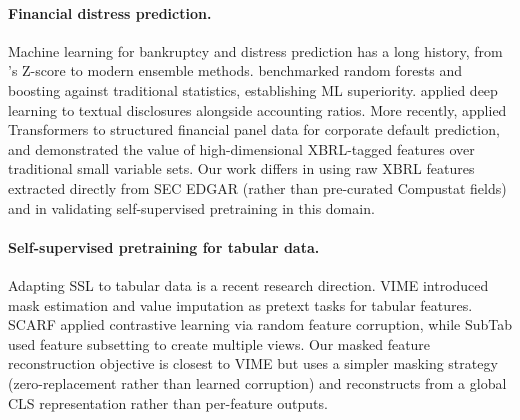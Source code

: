 \paragraph{Financial distress prediction.} Machine learning for bankruptcy and distress prediction has a long history, from \citet{altman1968financial}'s Z-score to modern ensemble methods. \citet{barboza2017machine} benchmarked random forests and boosting against traditional statistics, establishing ML superiority. \citet{mai2019deep} applied deep learning to textual disclosures alongside accounting ratios. More recently, \citet{korangi2023transformer} applied Transformers to structured financial panel data for corporate default prediction, and \citet{chen2022predicting} demonstrated the value of high-dimensional XBRL-tagged features over traditional small variable sets. Our work differs in using raw XBRL features extracted directly from SEC EDGAR (rather than pre-curated Compustat fields) and in validating self-supervised pretraining in this domain.

\paragraph{Self-supervised pretraining for tabular data.} Adapting SSL to tabular data is a recent research direction. VIME \citep{yoon2020vime} introduced mask estimation and value imputation as pretext tasks for tabular features. SCARF \citep{bahri2022scarf} applied contrastive learning via random feature corruption, while SubTab \citep{ucar2021subtab} used feature subsetting to create multiple views. Our masked feature reconstruction objective is closest to VIME but uses a simpler masking strategy (zero-replacement rather than learned corruption) and reconstructs from a global CLS representation rather than per-feature outputs.
